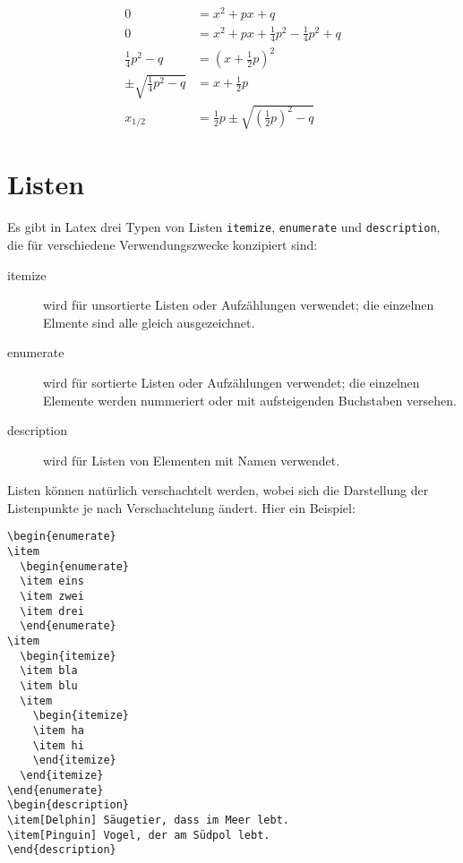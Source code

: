 \begin{align}
  0                  &= x^2 + px + q \\
  0                  &= x^2 + px + \frac{1}{4}p^2 - \frac{1}{4}p^2 + q \\
  \frac{1}{4}p^2 - q &= \left(x + \frac{1}{2}p \right)^2 \\
  \pm \sqrt{ \frac{1}{4}p^2 - q} &= x + \frac{1}{2}p \\
  x_{1/2}            &= \frac{1}{2}p \pm \sqrt{\left(\frac{1}{2}p\right)^2 - q}  
\end{align}

\section{Listen}
Es gibt in Latex drei Typen von Listen \verb+itemize+, \verb+enumerate+ und \verb+description+, die für
verschiedene Verwendungszwecke konzipiert sind:
\begin{description}
\item[itemize] wird für unsortierte Listen oder Aufzählungen verwendet; die einzelnen Elmente sind alle
  gleich ausgezeichnet.
\item[enumerate] wird für sortierte Listen oder Aufzählungen verwendet; die einzelnen Elemente werden
  nummeriert oder mit aufsteigenden Buchstaben versehen.
\item[description] wird für Listen von Elementen mit Namen verwendet. 
\end{description}
Listen können natürlich verschachtelt werden, wobei sich die Darstellung der Listenpunkte je nach Verschachtelung
ändert. Hier ein Beispiel:
\begin{verbatim}
\begin{enumerate}
\item
  \begin{enumerate}
  \item eins
  \item zwei
  \item drei
  \end{enumerate}
\item
  \begin{itemize}
  \item bla
  \item blu
  \item
    \begin{itemize}
    \item ha
    \item hi
    \end{itemize}
  \end{itemize}
\end{enumerate}
\begin{description}
\item[Delphin] Säugetier, dass im Meer lebt.
\item[Pinguin] Vogel, der am Südpol lebt. 
\end{description}
\end{verbatim}
